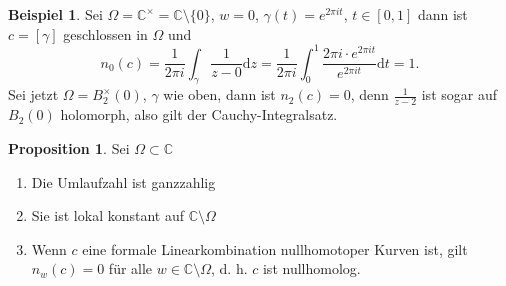 \documentclass[11pt,titlepage]{article}
\theoremstyle{definition}
\newtheorem{proposition}[theorem]{Proposition}
\newtheorem{example}[theorem]{Beispiel}
\theoremstyle{remark}
\begin{document}
	\begin{example}
		Sei $\Omega=\mathbb{C}^{\times}=\mathbb{C}\setminus\{0\}$, $w=0$, $\gamma(t)=e^{2\pi it}$, 
		$t\in[0,1]$ dann ist $c=[\gamma]$ geschlossen in $\Omega$ und 
		\[ n_0(c)=\frac{1}{2\pi i} \int_{\gamma}\frac{1}{z-0}\mathrm{d}z =\frac{1}{2\pi i} \int_0^1 
		\frac{2\pi i\cdot e^{2\pi it}}{e^{2\pi it}} \mathrm{d}t=1. \]
		Sei jetzt $\Omega =B_2^{\times}(0)$, $\gamma$ wie oben, dann ist $n_2(c)=0$, denn 
		$\frac{1}{z-2}$ ist sogar auf $B_2(0)$ holomorph, also gilt der Cauchy-Integralsatz.
	\end{example}
	
	\begin{proposition}
		Sei $\Omega\subset\mathbb{C}$
		\begin{enumerate}
			\item Die Umlaufzahl ist ganzzahlig \label{prop:umlauf1}
			\item Sie ist lokal konstant auf $\mathbb{C}\setminus\Omega$ \label{prop:umlauf2}
			\item Wenn $c$ eine formale Linearkombination nullhomotoper Kurven ist, gilt 
			$n_w(c)=0$ für alle $w\in\mathbb{C}\setminus\Omega$, d. h. $c$ ist nullhomolog. 
			\label{prop:umlauf3}
		\end{enumerate}
	\end{proposition}
	
\end{document}
